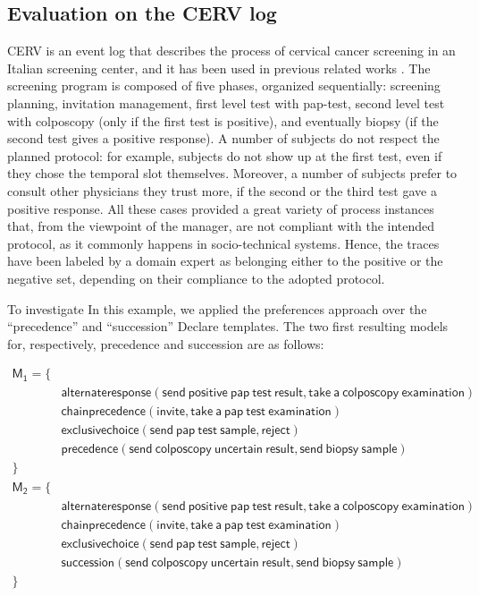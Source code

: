 \subsection{Evaluation on the CERV log}
\label{subsec:cerv}

CERV is an event log that describes the process of cervical cancer screening in an Italian screening center, and it has been used in previous related works \cite{2007b-Lamma,deviant-tkde}. The screening program is composed of five phases, organized sequentially: screening planning, invitation management, first level test with pap-test, second level test with colposcopy (only if the first test is positive), and eventually biopsy (if the second test gives a positive response). A number of subjects do not respect the planned protocol: for example, subjects do not show up at the first test, even if they chose the temporal slot themselves. Moreover, a number of subjects prefer to consult other physicians they trust more, if the second or the third test gave a positive response. All these cases provided a great variety of process instances that, from the viewpoint of the manager, are not compliant with the intended protocol, as it commonly happens in socio-technical systems.
%
Hence, the traces have been labeled by a domain expert as belonging either to the positive or the negative set, depending on their compliance to the adopted protocol.

To investigate 
In this example, we applied the preferences approach over the “precedence” and “succession” Declare templates. The two first resulting models for, respectively, precedence and succession are as follows:

\begin{align*}
\mathsf{M_1} = \{ & \\
& \mathsf{ alternateresponse(send\ positive\ pap\ test\ result, take\ a\ colposcopy\ examination)} \\
& \mathsf{ chainprecedence(invite, take\ a\ pap\ test\ examination)} \\
& \mathsf{ exclusivechoice(send\ pap\ test\ sample, reject)} \\
& \mathsf{precedence(send\ colposcopy\ uncertain\ result, send\ biopsy\ sample)} \\
\} & \\
\mathsf{M_2} = \{ & \\
& \mathsf{ alternateresponse(send\ positive\ pap\ test\ result, take\ a\ colposcopy\ examination)} \\
& \mathsf{ chainprecedence(invite, take\ a\ pap\ test\ examination)} \\
& \mathsf{ exclusivechoice(send\ pap\ test\ sample, reject)} \\
& \mathsf{succession(send\ colposcopy\ uncertain\ result, send\ biopsy\ sample)} \\
\} & 
\end{align*}

